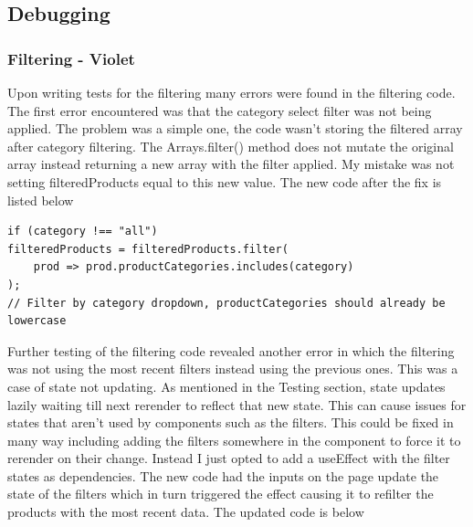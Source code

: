 \documentclass{article}[12pt]
\begin{document}
\subsection{Debugging}
\subsubsection{Filtering - Violet}
Upon writing tests for the filtering many errors were found in the filtering code. The first error encountered was that the category select filter was not being applied. The problem was a simple one, the code wasn't storing the filtered array after category filtering. The Arrays.filter() method does not mutate the original array instead returning a new array with the filter applied. My mistake was not setting filteredProducts equal to this new value. The new code after the fix is listed below

\begin{lstlisting}
if (category !== "all") 
filteredProducts = filteredProducts.filter(
    prod => prod.productCategories.includes(category)
);  
// Filter by category dropdown, productCategories should already be lowercase
\end{lstlisting}

Further testing of the filtering code revealed another error in which the filtering was not using the most recent filters instead using the previous ones. This was a case of state not updating. As mentioned in the Testing section, state updates lazily waiting till next rerender to reflect that new state. This can cause issues for states that aren't used by components such as the filters. This could be fixed in many way including adding the filters somewhere in the component to force it to rerender on their change. Instead I just opted to add a useEffect with the filter states as dependencies. The new code had the inputs on the page update the state of the filters which in turn triggered the effect causing it to refilter the products with the most recent data. The updated code is below
\end{document}
